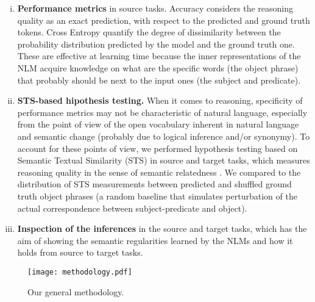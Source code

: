 \documentclass[preprint]{elsarticle}
\begin{document}
\begin{enumerate}[i.]
    \item \textbf{Performance metrics} in source tasks. Accuracy considers the reasoning quality as an exact prediction, with respect to the predicted and ground truth tokens. Cross Entropy quantify the degree of dissimilarity between the probability distribution predicted by the model and the ground truth one. These are effective at learning time because the inner representations of the NLM acquire knowledge on what are the specific words (the object phrase) that probably should be next to the input ones (the subject and predicate).
    \item \textbf{STS-based hipothesis testing.} When it comes to reasoning, specificity of performance metrics may not be characteristic of natural language, especially from the point of view of the open vocabulary inherent in natural language and semantic change (probably due to logical inference and/or synonymy). To account for these points of view,  we performed hypothesis testing based on Semantic Textual Similarity (STS) in source and target tasks, which measures reasoning quality in the sense of semantic relatedness \cite{arroyo2017lipn,arroyo2019unsupervised}. We compared to the distribution of STS measurements between predicted and shuffled ground truth object phrases (a random baseline that simulates perturbation of the actual correspondence between subject-predicate and object).
    \item \textbf{Inspection of the inferences} in the source and target tasks, which has the aim of showing the semantic regularities learned by the NLMs and how it holds from source to target tasks.
\end{enumerate}


\begin{figure}
    \centering
    \texttt{[image: methodology.pdf]}
    \caption{Our general methodology.}
    \label{fig:methodology}
\end{figure}
\end{document}
